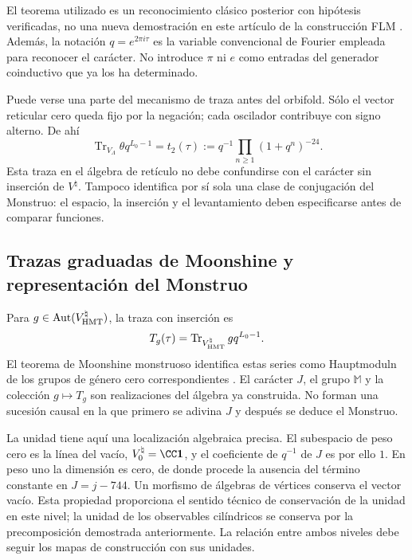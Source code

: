 El teorema utilizado es un reconocimiento clásico posterior con
hipótesis verificadas, no una nueva demostración en este artículo de
la construcción FLM \cite{flm}.
Además, la notación $q=e^{2\pi i\tau}$ es la variable convencional
de Fourier empleada para reconocer el carácter. No introduce $\pi$
ni $e$ como entradas del generador coinductivo que ya los ha determinado.

Puede verse una parte del mecanismo de traza antes del orbifold.
Sólo el vector reticular cero queda fijo por la negación; cada
oscilador contribuye con signo alterno. De ahí
\[
 \operatorname{Tr}_{V_\Lambda}\theta q^{L_0-1}
   =t_2(\tau)
   :=q^{-1}\prod_{n\geq1}(1+q^n)^{-24}.
\]
Esta traza en el álgebra de retículo no debe confundirse con el
carácter sin inserción de $V^\natural$. Tampoco identifica por sí
sola una clase de conjugación del Monstruo: el espacio, la inserción
y el levantamiento deben especificarse antes de comparar funciones.



\subsection{Trazas graduadas de Moonshine y representación del Monstruo}
\label{exc:alcance}

Para $g\in\operatorname{Aut}(V^\natural_{\rm HMT})$, la traza
con inserción es
\[
 T_g(\tau)=
 \operatorname{Tr}_{V^\natural_{\rm HMT}}gq^{L_0-1}.
\]
El teorema de Moonshine monstruoso identifica estas series como
Hauptmoduln de los grupos de género cero correspondientes
\cite[teorema~1.1]{borcherds}.
El carácter $J$, el grupo $\mathbb M$ y la colección $g\mapsto T_g$
son realizaciones del álgebra ya construida. No forman una sucesión
causal en la que primero se adivina $J$ y después se deduce el Monstruo.

La unidad tiene aquí una localización algebraica precisa. El subespacio
de peso cero es la línea del vacío, \(V^\natural_0=\CC\mathbf1\), y
el coeficiente de \(q^{-1}\) de \(J\) es por ello \(1\). En peso uno
la dimensión es cero, de donde procede la ausencia del término constante
en \(J=j-744\). Un morfismo de álgebras de vértices conserva el vector
vacío. Esta propiedad proporciona el sentido técnico de conservación
de la unidad en este nivel; la unidad de los observables cilíndricos
se conserva por la precomposición demostrada anteriormente. La relación
entre ambos niveles debe seguir los mapas de construcción con sus unidades.

